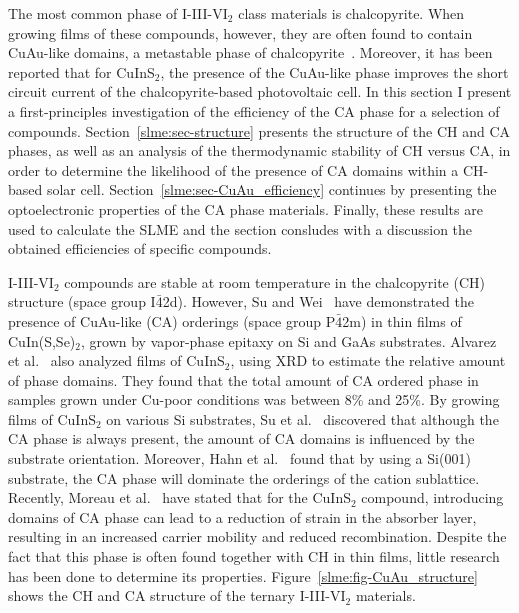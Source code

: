 \begin{refsection}
The most common phase of I-III-VI$_2$ class materials is chalcopyrite. When 
growing films of these compounds, however, they are often found to contain 
CuAu-like domains, a metastable phase of chalcopyrite~\cite{Su1999}. Moreover, it has been 
reported that for CuInS$_2$, the presence of the CuAu-like phase improves the 
short circuit current of the chalcopyrite-based photovoltaic cell. In this 
section I present a first-principles investigation of the efficiency of the CA 
phase for a selection of compounds. Section~\ref{slme:sec-structure} presents 
the structure of the CH and CA phases, as well as an analysis of the thermodynamic 
stability of CH versus CA, in order to determine the likelihood of the presence of CA domains 
within a CH-based solar cell. Section~\ref{slme:sec-CuAu_efficiency} continues by presenting the optoelectronic 
properties of the CA phase materials. Finally, these results are used to calculate 
the SLME and the section consludes with a discussion the obtained efficiencies of specific compounds.  
 
 
I-III-VI$_2$ compounds are stable at room temperature in the chalcopyrite (CH) 
structure (space group I$\bar{4}$2d). However, Su and Wei~\cite{Su1999} have 
demonstrated the presence of CuAu-like (CA) orderings (space group 
P$\bar{4}$2m) in thin films of CuIn(S,Se)$_2$, grown by vapor-phase epitaxy on 
Si and GaAs substrates.  Alvarez et al.~\cite{Alvarez2002} also analyzed films 
of CuInS$_2$, using XRD to estimate the relative amount of phase domains. They 
found that the total amount of CA ordered phase in samples grown under Cu-poor 
conditions was between 8\% and 25\%. By growing films of CuInS$_2$ on various 
Si substrates, Su et al.~\cite{Su2000} discovered that although the CA phase 
is always present, the amount of CA domains is influenced by the substrate 
orientation. Moreover, Hahn et al.~\cite{Hahn2001} found that by using a 
Si(001) substrate, the CA phase will dominate the orderings of the cation 
sublattice. Recently, Moreau et al.~\cite{Moreau2015} have stated that for the 
CuInS$_2$ compound, introducing domains of CA phase can lead to a reduction of 
strain in the absorber layer, resulting in an increased carrier mobility and 
reduced recombination. Despite the fact that this phase is often found 
together with CH in thin films, little research has been done to determine its 
properties. Figure~\ref{slme:fig-CuAu_structure} shows the CH and CA structure 
of the ternary I-III-VI$_2$ materials. 
 

\end{refsection}

